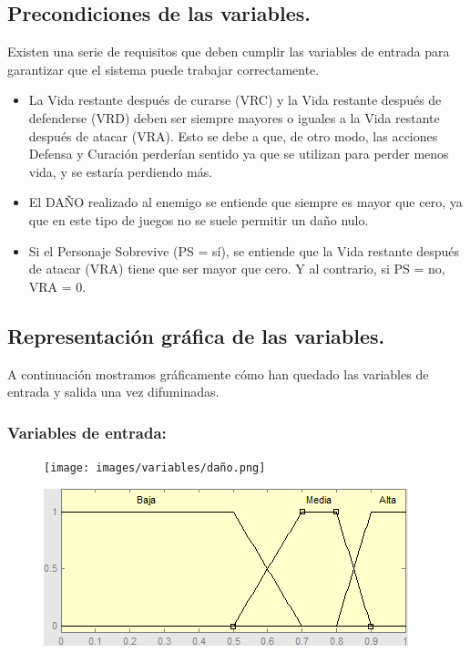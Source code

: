 \subsection{Precondiciones de las variables.}
Existen una serie de requisitos que deben cumplir las variables de entrada para garantizar que el sistema puede trabajar correctamente.
\begin{itemize}
	\item La Vida restante después de curarse (VRC) y la Vida restante después de defenderse (VRD) deben ser siempre mayores o iguales a la Vida restante después de atacar (VRA). Esto se debe a que, de otro modo, las acciones Defensa y Curación perderían sentido ya que se utilizan para perder menos vida, y se estaría perdiendo más.
	
	\item El DAÑO realizado al enemigo se entiende que siempre es mayor que cero, ya que en este tipo de juegos no se suele permitir un daño nulo.
	
	\item Si el Personaje Sobrevive (PS = sí), se entiende que la Vida restante después de atacar (VRA) tiene que ser mayor que cero. Y al contrario, si PS = no, VRA = 0.
	
\end{itemize}



\subsection{Representación gráfica de las variables.}
A continuación mostramos gráficamente cómo han quedado las variables de entrada y salida una vez difuminadas.
\subsubsection{Variables de entrada:}
\begin{figure}[H]
	\centering
	\begin{minipage}{.5\textwidth}
		\centering
		\texttt{[image: images/variables/daño.png]}
	\end{minipage}%
	\begin{minipage}{.5\textwidth}
		\centering
		\includegraphics[scale=0.67]{images/variables/pa.png}
	\end{minipage}
\end{figure}

